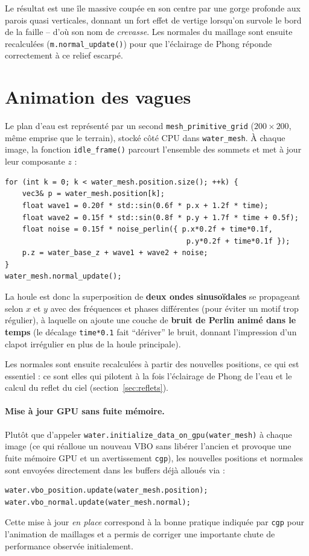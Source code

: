 \documentclass[11pt,a4paper]{article}
\begin{document}
Le résultat est une île massive coupée en son centre par une gorge
profonde aux parois quasi verticales, donnant un fort effet de vertige
lorsqu'on survole le bord de la faille -- d'où son nom de
\emph{crevasse}. Les normales du maillage sont ensuite recalculées
(\texttt{m.normal\_update()}) pour que l'éclairage de Phong réponde
correctement à ce relief escarpé.

\section{Animation des vagues}
\label{sec:vagues}

Le plan d'eau est représenté par un second \texttt{mesh\_primitive\_grid}
($200\times 200$, même emprise que le terrain), stocké côté CPU dans
\texttt{water\_mesh}. À chaque image, la fonction \texttt{idle\_frame()}
parcourt l'ensemble des sommets et met à jour leur composante $z$ :

\begin{lstlisting}
for (int k = 0; k < water_mesh.position.size(); ++k) {
    vec3& p = water_mesh.position[k];
    float wave1 = 0.20f * std::sin(0.6f * p.x + 1.2f * time);
    float wave2 = 0.15f * std::sin(0.8f * p.y + 1.7f * time + 0.5f);
    float noise = 0.15f * noise_perlin({ p.x*0.2f + time*0.1f,
                                          p.y*0.2f + time*0.1f });
    p.z = water_base_z + wave1 + wave2 + noise;
}
water_mesh.normal_update();
\end{lstlisting}

La houle est donc la superposition de \textbf{deux ondes
sinusoïdales} se propageant selon $x$ et $y$ avec des fréquences et
phases différentes (pour éviter un motif trop régulier), à laquelle on
ajoute une couche de \textbf{bruit de Perlin animé dans le temps}
(le décalage \texttt{time*0.1} fait ``dériver'' le bruit, donnant
l'impression d'un clapot irrégulier en plus de la houle principale).

Les normales sont ensuite recalculées à partir des nouvelles positions,
ce qui est essentiel : ce sont elles qui pilotent à la fois
l'éclairage de Phong de l'eau et le calcul du reflet du ciel
(section~\ref{sec:reflets}).

\paragraph{Mise à jour GPU sans fuite mémoire.} Plutôt que d'appeler
\texttt{water.initialize\_data\_on\_gpu(water\_mesh)} à chaque image
(ce qui réalloue un nouveau VBO sans libérer l'ancien et provoque une
fuite mémoire GPU et un avertissement \texttt{cgp}), les nouvelles
positions et normales sont envoyées directement dans les buffers déjà
alloués via :
\begin{lstlisting}
water.vbo_position.update(water_mesh.position);
water.vbo_normal.update(water_mesh.normal);
\end{lstlisting}
Cette mise à jour \emph{en place} correspond à la bonne pratique
indiquée par \texttt{cgp} pour l'animation de maillages et a permis de
corriger une importante chute de performance observée initialement.
\end{document}
